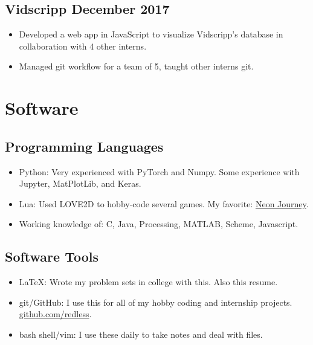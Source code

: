 \documentclass[12pt]{article}
\begin{document}
{\subsection*{\indent Vidscripp \hfill December 2017}
\begin{itemize}
\item
  Developed a web app in JavaScript to visualize Vidscripp's database in collaboration with 4 other interns.
\item
  Managed git workflow for a team of 5, taught other interns git.
  \end{itemize}
  \begin{comment}
\section*{Publications}
\begin{itemize}
\item J.A Stewart, G. Brookman, P. Price, M. Franco, W. Ji, K. Hattar, R. Dingreville, 2018. Characterizing single isolated radiation-damage events from molecular dynamics via virtual diffraction methods, Journal of Applied Physics.
\end{itemize}
\end{comment}

\section*{Software}
\subsection*{\indent Programming Languages}
\begin{itemize}
\item
  Python: Very experienced with PyTorch and Numpy. Some experience with Jupyter, MatPlotLib, and Keras.
\item
  Lua: Used LOVE2D to hobby-code several games. %
  My
  favorite: \href{https://github.com/redless/neonjourney}{Neon Journey}.
  \item Working knowledge of: C, Java, Processing, MATLAB, Scheme, Javascript.
\end{itemize}


\subsection*{\indent Software Tools}
\begin{itemize}
\item
  LaTeX: Wrote my problem sets in college with this. Also this resume. 
\item
  git/GitHub: I use this for all of my hobby coding and internship
  projects. \href{https://github.com/redless}{github.com/redless}.
 \item bash shell/vim: I use these daily to take notes and deal with files.
\end{itemize}

}
\end{document}

